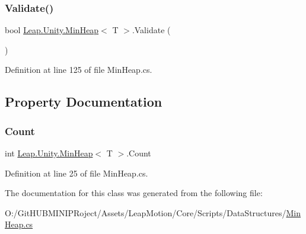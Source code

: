 \mbox{\label{class_leap_1_1_unity_1_1_min_heap_aab63796b0e8d31cc957fd9e6ccfe6775}} 
\subsubsection{\texorpdfstring{Validate()}{Validate()}}
{\footnotesize\ttfamily bool \mbox{\hyperlink{class_leap_1_1_unity_1_1_min_heap}{Leap.\+Unity.\+Min\+Heap}}$<$ T $>$.Validate (\begin{DoxyParamCaption}{ }\end{DoxyParamCaption})}



Definition at line 125 of file Min\+Heap.\+cs.



\subsection{Property Documentation}
\mbox{\label{class_leap_1_1_unity_1_1_min_heap_a61f29a6626cf9ff04ec8a066dd39d1c1}} 
\subsubsection{\texorpdfstring{Count}{Count}}
{\footnotesize\ttfamily int \mbox{\hyperlink{class_leap_1_1_unity_1_1_min_heap}{Leap.\+Unity.\+Min\+Heap}}$<$ T $>$.Count\hspace{0.3cm}{\ttfamily [get]}}



Definition at line 25 of file Min\+Heap.\+cs.



The documentation for this class was generated from the following file\+:\begin{DoxyCompactItemize}
\item 
O\+:/\+Git\+H\+U\+B\+M\+I\+N\+I\+P\+Roject/\+Assets/\+Leap\+Motion/\+Core/\+Scripts/\+Data\+Structures/\mbox{\hyperlink{_min_heap_8cs}{Min\+Heap.\+cs}}\end{DoxyCompactItemize}
